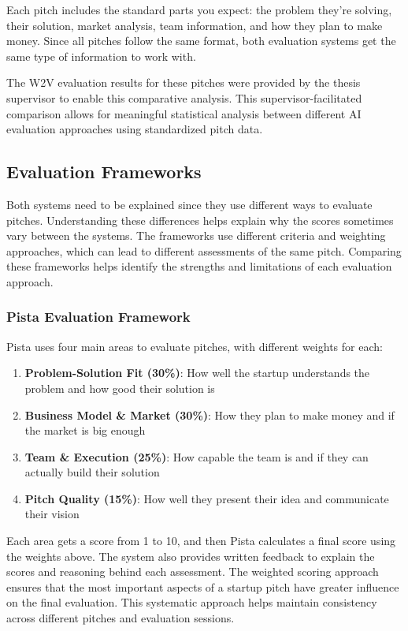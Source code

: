 Each pitch includes the standard parts you expect: the problem they're solving, their solution, market analysis, team information, and how they plan to make money. Since all pitches follow the same format, both evaluation systems get the same type of information to work with.

The W2V evaluation results for these pitches were provided by the thesis supervisor to enable this comparative analysis. This supervisor-facilitated comparison allows for meaningful statistical analysis between different AI evaluation approaches using standardized pitch data.

\subsection{Evaluation Frameworks}
\label{subsec:frameworks}

Both systems need to be explained since they use different ways to evaluate pitches. Understanding these differences helps explain why the scores sometimes vary between the systems. The frameworks use different criteria and weighting approaches, which can lead to different assessments of the same pitch. Comparing these frameworks helps identify the strengths and limitations of each evaluation approach.

\subsubsection{Pista Evaluation Framework}

Pista uses four main areas to evaluate pitches, with different weights for each:

\begin{enumerate}
    \item \textbf{Problem-Solution Fit (30\%)}: How well the startup understands the problem and how good their solution is
    \item \textbf{Business Model \& Market (30\%)}: How they plan to make money and if the market is big enough
    \item \textbf{Team \& Execution (25\%)}: How capable the team is and if they can actually build their solution
    \item \textbf{Pitch Quality (15\%)}: How well they present their idea and communicate their vision
\end{enumerate}

Each area gets a score from 1 to 10, and then Pista calculates a final score using the weights above. The system also provides written feedback to explain the scores and reasoning behind each assessment. The weighted scoring approach ensures that the most important aspects of a startup pitch have greater influence on the final evaluation. This systematic approach helps maintain consistency across different pitches and evaluation sessions.

